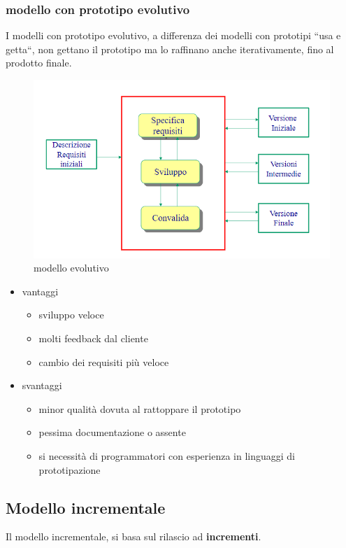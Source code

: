 \subsubsection{modello con prototipo evolutivo}
I modelli con prototipo evolutivo, a differenza dei modelli con prototipi ``usa e getta``, non gettano il prototipo
ma lo raffinano anche iterativamente, fino al prodotto finale.
\begin{figure}[htbp]
    \centering    
    \includegraphics[scale=0.7]{modello_evolutivo.PNG}
    \caption{modello evolutivo}
    \label{fig:modello evolutivo}
\end{figure}   
\begin{itemize}
    \item vantaggi
        \begin{itemize}
            \item sviluppo veloce
            \item molti feedback dal cliente
            \item cambio dei requisiti pi\`u veloce
        \end{itemize}
    \item svantaggi
        \begin{itemize}
            \item minor qualit\`a dovuta al rattoppare il prototipo
            \item pessima documentazione o assente
            \item si necessit\`a di programmatori con esperienza in linguaggi di prototipazione
        \end{itemize}
\end{itemize}
\subsection{Modello incrementale}
Il modello incrementale, si basa sul rilascio ad \textbf{incrementi}.

